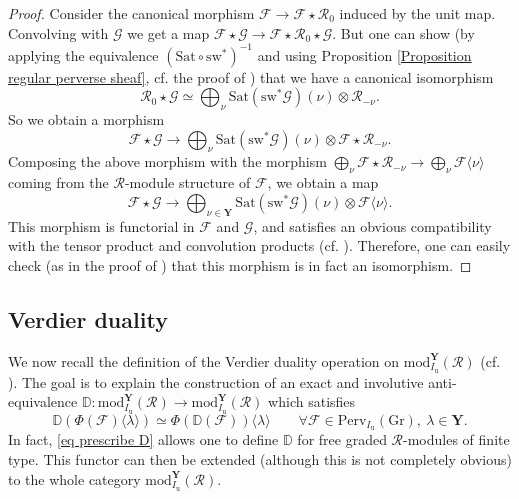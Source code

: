 \documentclass[11pt]{amsart}
\theoremstyle{plain}
\theoremstyle{remark}
\numberwithin{equation}{section}
\begin{document}
 \begin{proof}
     Consider the canonical morphism $\mathcal{F}\to\mathcal{F}\star\mathcal{R}_0$ induced by the unit map. Convolving with $\mathcal{G}$ we get a map $\mathcal{F}\star\mathcal{G}\to \mathcal{F}\star\mathcal{R}_0\star \mathcal{G}$. But one can show (by applying the equivalence $(\mathrm{Sat}\circ\mathrm{sw}^*)^{-1}$ and using Proposition \ref{Proposition regular perverse sheaf}, cf. the proof of \cite[Lemma 5.2]{achar2022geometric}) that we have a canonical isomorphism
     $$\mathcal{R}_0\star \mathcal{G}\simeq \bigoplus_\nu\mathrm{Sat}(\mathrm{sw}^*\mathcal{G})(\nu)\otimes\mathcal{R}_{-\nu}. $$
    So we obtain a morphism 
    $$\mathcal{F}\star\mathcal{G}\to\bigoplus_\nu \mathrm{Sat}(\mathrm{sw}^*\mathcal{G})(\nu)\otimes\mathcal{F}\star\mathcal{R}_{-\nu}. $$
    Composing the above morphism with the morphism $\bigoplus_\nu\mathcal{F}\star\mathcal{R}_{-\nu}\to\bigoplus_\nu\mathcal{F}\langle\nu\rangle$ coming from the $\mathcal{R}$-module structure of $\mathcal{F}$, we obtain a map
    $$\mathcal{F}\star\mathcal{G}\to\bigoplus_{\nu\in\mathbf{Y}}\mathrm{Sat}(\mathrm{sw}^*\mathcal{G})(\nu)\otimes\mathcal{F}\langle\nu\rangle.$$
    This morphism is functorial in $\mathcal{F}$ and $\mathcal{G}$, and satisfies an obvious compatibility with the tensor product and convolution products (cf. \cite[§1.3.6]{ABBGM}). Therefore, one can easily check (as in the proof of \cite[Proposition 2.3]{ARKHIPOV2003114}) that this morphism is in fact an isomorphism.
 \end{proof}
	\subsection{Verdier duality}\label{section Verdier} We now recall the definition of the Verdier duality operation on $\mathrm{mod}^\mathbf{Y}_{I_\mathrm{u}}(\mathcal{R})$ (cf. \cite[§9.1]{achar2022geometric}). The goal is to explain the construction of an exact and involutive anti-equivalence $\mathbb{D}:\mathrm{mod}^\mathbf{Y}_{I_\mathrm{u}}(\mathcal{R})\to \mathrm{mod}^\mathbf{Y}_{I_\mathrm{u}}(\mathcal{R})$ which satisfies
	\begin{equation}\label{eq prescribe D}
		\mathbb{D}(\Phi(\mathcal{F})\langle\lambda\rangle)\simeq \Phi(\mathbb{D}(\mathcal{F}))\langle\lambda\rangle\qquad \forall \mathcal{F}\in\mathrm{Perv}_{I_\mathrm{u}}(\mathrm{Gr}),~\lambda\in\mathbf{Y}.
	\end{equation}
	In fact, \eqref{eq prescribe D} allows one to define $\mathbb{D}$ for free graded $\mathcal{R}$-modules of finite type. This functor can then be extended (although this is not completely obvious) to the whole category $\mathrm{mod}^\mathbf{Y}_{I_\mathrm{u}}(\mathcal{R})$.
	
\end{document}
